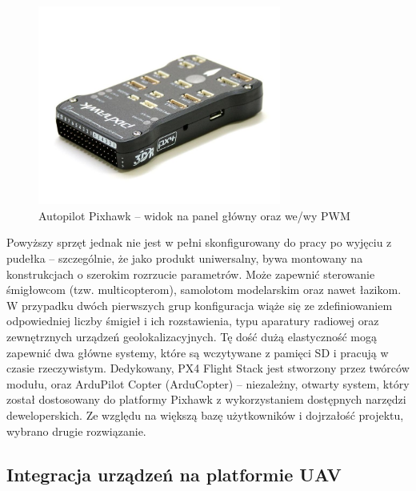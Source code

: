 \begin{figure}[h]
	\centering
	\includegraphics[width=8cm]{5_pixhawk.jpg}
	\caption{Autopilot Pixhawk -- widok na panel główny oraz we/wy PWM}
	\label{fig:pixhawk}
\end{figure}

Powyższy sprzęt jednak nie jest w pełni skonfigurowany do pracy po wyjęciu z pudełka -- szczególnie, że jako produkt uniwersalny, bywa montowany na konstrukcjach o szerokim rozrzucie parametrów. 
Może zapewnić sterowanie śmigłowcom (tzw. multicopterom), samolotom modelarskim oraz nawet łazikom. %
W przypadku dwóch pierwszych grup konfiguracja wiąże się ze zdefiniowaniem odpowiedniej liczby śmigieł i ich rozstawienia, typu aparatury radiowej oraz zewnętrznych urządzeń geolokalizacyjnych. 
Tę dość dużą elastyczność mogą zapewnić dwa główne systemy, które są wczytywane z pamięci SD i pracują w czasie rzeczywistym. 
Dedykowany, PX4 Flight Stack jest stworzony przez twórców modułu, oraz ArduPilot Copter (ArduCopter) -- niezależny, otwarty system, który został dostosowany do platformy Pixhawk z wykorzystaniem dostępnych narzędzi deweloperskich. 
Ze względu na większą bazę użytkowników i dojrzałość projektu, wybrano drugie rozwiązanie.

\subsection{Integracja urządzeń na platformie UAV} %

